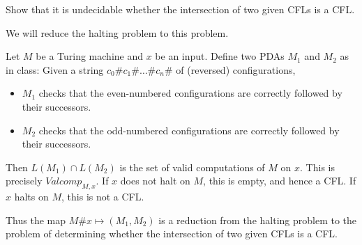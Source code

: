 \documentclass[12pt]{article}
\begin{document}
\begin{problem*}
    Show that it is undecidable whether the intersection of two given CFLs
    is a CFL.
\end{problem*}
\begin{solution}
    We will reduce the halting problem to this problem.

    Let $M$ be a Turing machine and $x$ be an input.
    Define two PDAs $M_1$ and $M_2$ as in class:
    Given a string $c_0 \# c_1 \# \dots \# c_n \#$ of (reversed)
    configurations,
    \begin{itemize}
        \item $M_1$ checks that the even-numbered configurations are correctly
        followed by their successors.
        \item $M_2$ checks that the odd-numbered configurations are correctly
        followed by their successors.
    \end{itemize}
    Then $L(M_1) \cap L(M_2)$ is the set of valid computations of $M$ on $x$.
    This is precisely $Valcomp_{M, x}$.
    If $x$ does not halt on $M$, this is empty, and hence a CFL.
    If $x$ halts on $M$, this is not a CFL.

    Thus the map $M\#x \mapsto (M_1, M_2)$ is a reduction from the halting
    problem to the problem of determining whether the intersection of two
    given CFLs is a CFL.
\end{solution}
\end{document}
